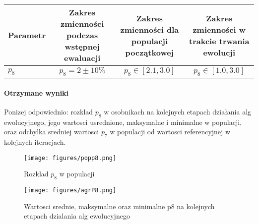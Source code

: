 \documentclass[]{article}
\let\oldparagraph\paragraph
\renewcommand{\paragraph}[1]{\oldparagraph{#1}\mbox{}}
\begin{document}
\begin{longtable}[c]{@{}lccc@{}}
\toprule
\begin{minipage}[b]{0.13\columnwidth}\raggedright\strut
Parametr
\strut\end{minipage} &
\begin{minipage}[b]{0.26\columnwidth}\centering\strut
Zakres zmienności podczas wstępnej ewaluacji
\strut\end{minipage} &
\begin{minipage}[b]{0.24\columnwidth}\centering\strut
Zakres zmienności dla populacji początkowej
\strut\end{minipage} &
\begin{minipage}[b]{0.26\columnwidth}\centering\strut
Zakres zmienności w trakcie trwania ewolucji
\strut\end{minipage}\tabularnewline
\midrule
\endhead
\begin{minipage}[t]{0.13\columnwidth}\raggedright\strut
\(p_8\)
\strut\end{minipage} &
\begin{minipage}[t]{0.26\columnwidth}\centering\strut
\(p_8 = 2 \pm 10 \%\)
\strut\end{minipage} &
\begin{minipage}[t]{0.24\columnwidth}\centering\strut
\(p_{8} \in [2.1,3.0]\)
\strut\end{minipage} &
\begin{minipage}[t]{0.26\columnwidth}\centering\strut
\(p_8 \in [1.0,3.0]\)
\strut\end{minipage}\tabularnewline
\bottomrule
\end{longtable}

\paragraph{Otrzymane wyniki}\label{otrzymane-wyniki-1}

Ponizej odpowiednio: rozklad \(p_8\) w osobnikach na kolejnych etapach
działania alg ewolucyjnego, jego wartosci usrednione, maksymalne i
minimalne w populacji, oraz odchylka sredniej wartosci \(p_7\) w
populacji od wartosci referencyjnej w kolejnych iteracjach.

\begin{figure}[htbp]
\centering
\texttt{[image: figures/popp8.png]}
\caption{Rozklad \(p_8\) w populacji}
\end{figure}

\begin{figure}[htbp]
\centering
\texttt{[image: figures/agrP8.png]}
\caption{Wartosci srednie, maksymalne oraz minimalne p8 na kolejnych
etapach dzialania alg ewolucyjnego}
\end{figure}
\end{document}
